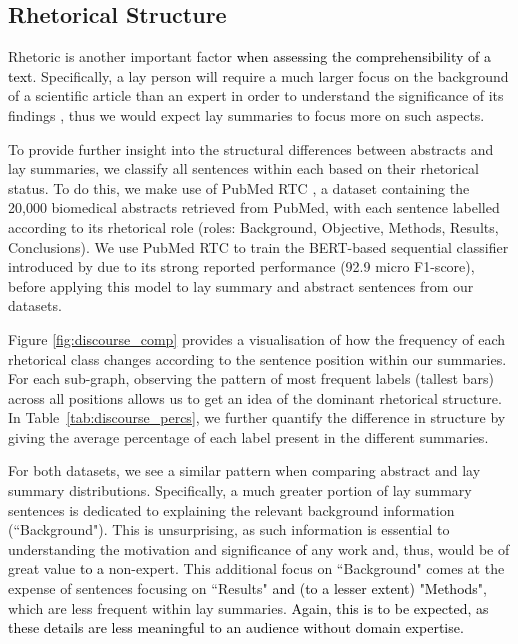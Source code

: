 \documentclass[11pt]{article}
\begin{document}
\subsection{Rhetorical Structure}  \label{subsec:analysis-rhetoric}
Rhetoric is another important factor \textcolor{black}{when assessing the comprehensibility of a text}.
Specifically, a lay person will require a much larger focus on the background of a scientific article than an expert in order to understand the significance of its findings \citep{elifeDigest}, thus we would expect lay summaries to focus more on such aspects. 


To provide further insight into the structural differences between abstracts and lay summaries, we classify all sentences within each based on their rhetorical status. To do this, we make use of PubMed RTC \citep{Dernoncourt2017-te}, a dataset containing the 20,000 biomedical abstracts retrieved from PubMed, with each sentence labelled according to its rhetorical role (roles: Background, Objective, Methods, Results, Conclusions).
We use PubMed RTC to train the BERT-based sequential classifier introduced by \citet{Cohan2019-ru} due to its strong reported performance (92.9 micro F1-score), before applying this model to lay summary and abstract sentences from our datasets.

Figure \ref{fig:discourse_comp} provides a visualisation of how the frequency of each rhetorical class changes according to the sentence position within our summaries. For each sub-graph, observing the pattern of most frequent labels (tallest bars) across all positions allows us to get an idea of the dominant rhetorical structure. In Table~\ref{tab:discourse_percs}, we further quantify the difference in structure by giving the average percentage of each label present in the different summaries. 

For both datasets, we see a similar pattern when comparing abstract and lay summary distributions.
Specifically, a much greater portion of lay summary sentences is dedicated to explaining the relevant background information (``Background"). This is unsurprising, as such information is essential to understanding the motivation and significance \textcolor{black}{of} any work and, thus, would be of great value \textcolor{black}{to a} non-expert. This additional focus on ``Background" comes at the expense of sentences focusing on ``Results" \textcolor{black}{and (to a lesser extent) "Methods"}, which are less frequent within lay summaries. 
\textcolor{black}{Again, this is to be expected, as these details are less meaningful to an audience without domain expertise.}
\end{document}
